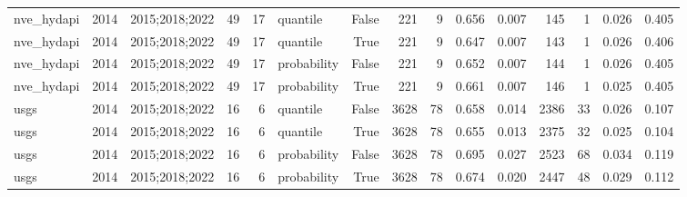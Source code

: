 \begin{table}
{\begin{tabular}{lrlrrlrrrrrrrrr}
nve\_hydapi & 2014 & 2015;2018;2022 & 49 & 17 & quantile & False & 221 & 9 & 0.656 & 0.007 & 145 & 1 & 0.026 & 0.405 \\
nve\_hydapi & 2014 & 2015;2018;2022 & 49 & 17 & quantile & True & 221 & 9 & 0.647 & 0.007 & 143 & 1 & 0.026 & 0.406 \\
nve\_hydapi & 2014 & 2015;2018;2022 & 49 & 17 & probability & False & 221 & 9 & 0.652 & 0.007 & 144 & 1 & 0.026 & 0.405 \\
nve\_hydapi & 2014 & 2015;2018;2022 & 49 & 17 & probability & True & 221 & 9 & 0.661 & 0.007 & 146 & 1 & 0.025 & 0.405 \\
usgs & 2014 & 2015;2018;2022 & 16 & 6 & quantile & False & 3628 & 78 & 0.658 & 0.014 & 2386 & 33 & 0.026 & 0.107 \\
usgs & 2014 & 2015;2018;2022 & 16 & 6 & quantile & True & 3628 & 78 & 0.655 & 0.013 & 2375 & 32 & 0.025 & 0.104 \\
usgs & 2014 & 2015;2018;2022 & 16 & 6 & probability & False & 3628 & 78 & 0.695 & 0.027 & 2523 & 68 & 0.034 & 0.119 \\
usgs & 2014 & 2015;2018;2022 & 16 & 6 & probability & True & 3628 & 78 & 0.674 & 0.020 & 2447 & 48 & 0.029 & 0.112 \\
\bottomrule
\end{tabular}
}
\end{table}
